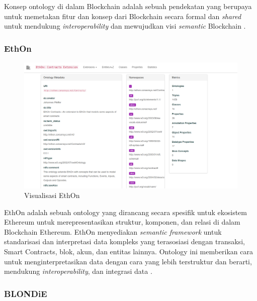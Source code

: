 Konsep ontology di dalam Blockchain adalah sebuah pendekatan yang berupaya untuk memetakan fitur dan konsep dari Blockchain secara formal dan \textit{shared} untuk mendukung \textit{interoperability} \parencite{9770809} dan mewujudkan visi \textit{semantic} Blockchain \parencite{hector2020blondie}. 

\subsubsection{EthOn}
\label{subsubsec:ethon}

\begin{figure}
  \centering
  \includegraphics[width=1\textwidth]{resources/chapter-2/ethon.png}
  \caption{Visualisasi EthOn \parencite{ethon2024}}
  \label{image:ethon}
\end{figure}

EthOn adalah sebuah ontology yang dirancang secara spesifik untuk ekosistem Ethereum untuk merepresentasikan struktur, komponen, dan relasi di dalam Blockchain Ethereum. EthOn menyediakan \textit{semantic framework} untuk standarisasi dan interpretasi data kompleks yang terasosiasi dengan transaksi, Smart Contracts, blok, akun, dan entitas lainnya. Ontology ini memberikan cara untuk menginterpretasikan data dengan cara yang lebih terstruktur dan berarti, mendukung \textit{interoperability}, dan integrasi data \parencite{pfeffer2016ethon}.

\subsubsection{BLONDiE}
\label{subsubsec:blondie}

